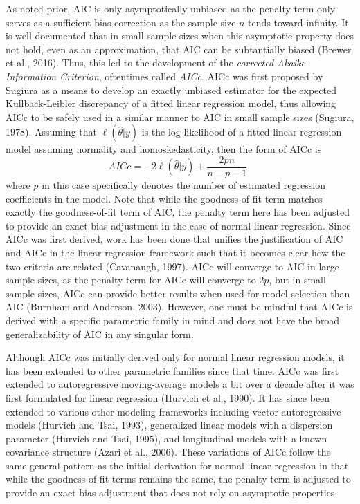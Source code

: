 		As noted prior, AIC is only asymptotically unbiased as the penalty term only serves as a sufficient bias correction as the sample size $n$ tends toward infinity. It is well-documented that
		in small sample sizes when this asymptotic property does not hold, even as an approximation, that AIC can be subtantially biased (Brewer et al., 2016). Thus, this led to the development of the 
		\textit{corrected Akaike Information Criterion}, oftentimes called \textit{AICc}. AICc was first proposed by Sugiura as a means to develop an exactly unbiased estimator for the expected
		Kullback-Leibler discrepancy of a fitted linear regression model, thus allowing AICc to be safely used in a similar manner to AIC in small sample sizes (Sugiura, 1978). Assuming that
		$\ell(\hat{\theta}|y)$ is the log-likelihood of a fitted linear regression model assuming normality and homoskedasticity, then the form of AICc is 
		\begin{equation}
			AICc = -2 \ell(\hat{\theta}|y) + \frac{2 p n}{n - p - 1},
		\end{equation}
		where $p$ in this case specifically denotes the number of estimated regression coefficients in the model. Note that while the goodness-of-fit term matches exactly the goodness-of-fit term
		of AIC, the penalty term here has been adjusted to provide an exact bias adjustment in the case of  normal linear regression. Since AICc was first derived, work has been done that unifies
		the justification of AIC and AICc in the linear regression framework such that it becomes clear how the two criteria are related (Cavanaugh, 1997). AICc will converge to AIC in large sample
		sizes, as the penalty term for AICc will converge to $2p$, but in small sample sizes, AICc can provide better results when used for model selection than AIC (Burnham and Anderson, 2003).
		However, one must be mindful that AICc is derived with a specific parametric family in mind and does not have the broad generalizability of AIC in any singular form.

		Although AICc was initially derived only for normal linear regression models, it has been extended to other parametric families since that time. AICc was first extended to autoregressive
		moving-average models a bit over a decade after it was first formulated for linear regression (Hurvich et al., 1990). It has since been extended to various other modeling frameworks
		including vector autoregressive models (Hurvich and Tsai, 1993), generalized linear models with a dispersion parameter (Hurvich and Tsai, 1995), and longitudinal models with a known
		covariance structure (Azari et al., 2006). These variations of AICc follow the same general pattern as the initial derivation for normal linear regression in that while the goodness-of-fit
		terms remains the same, the penalty term is adjusted to provide an exact bias adjustment that does not rely on asymptotic properties.

